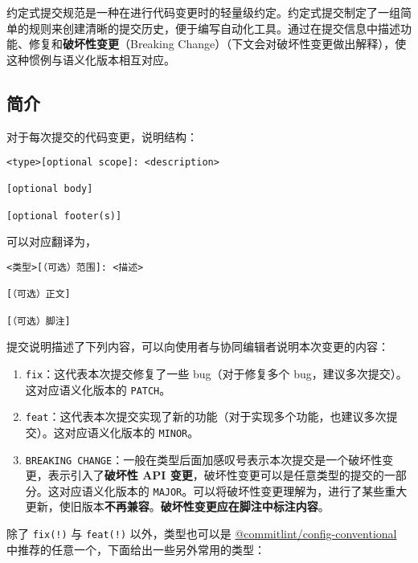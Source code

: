 
\begin{issues}
\issueDraft
\issueTODO
\end{issues}

约定式提交规范是一种在进行代码变更时的轻量级约定。约定式提交制定了一组简单的规则来创建清晰的提交历史，便于编写自动化工具。通过在提交信息中描述功能、修复和\textbf{破坏性变更}（Breaking Change）（下文会对破坏性变更做出解释），使这种惯例与语义化版本相互对应。

\subsection{简介}
对于每次提交的代码变更，说明结构：
\begin{lstlisting}[language=none]
<type>[optional scope]: <description>

[optional body]

[optional footer(s)]
\end{lstlisting}
可以对应翻译为，
\begin{lstlisting}[language=none]
<类型>[（可选）范围]: <描述>

[（可选）正文]

[（可选）脚注]
\end{lstlisting}
提交说明描述了下列内容，可以向使用者与协同编辑者说明本次变更的内容：
\begin{enumerate}
\item \verb`fix`：这代表本次提交修复了一些 bug（对于修复多个 bug，建议多次提交）。这对应语义化版本的 \verb`PATCH`。
\item \verb`feat`：这代表本次提交实现了新的功能（对于实现多个功能，也建议多次提交）。这对应语义化版本的 \verb`MINOR`。
\item \verb`BREAKING CHANGE`：一般在类型后面加感叹号表示本次提交是一个破坏性变更，表示引入了\textbf{破坏性 API 变更}，破坏性变更可以是任意类型的提交的一部分。这对应语义化版本的 \verb`MAJOR`。可以将破坏性变更理解为，进行了某些重大更新，使旧版本\textbf{不再兼容}。\textbf{破坏性变更应在脚注中标注内容}。
\end{enumerate}
除了 \verb`fix(!)` 与 \verb`feat(!)` 以外，类型也可以是 \href{https://github.com/conventional-changelog/commitlint/tree/master/\%2540commitlint/config-conventional}{@commitlint/config-conventional} 中推荐的任意一个，下面给出一些另外常用的类型：
